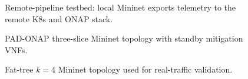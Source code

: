 
\begin{figure}[H]
\centering
\resizebox{\textwidth}{!}{}
\caption{Remote-pipeline testbed: local Mininet exports telemetry to the remote K8s and ONAP stack.}
\label{fig:testbed-remote-pipeline}
\end{figure}

\begin{figure}[H]
\centering
\resizebox{0.98\textwidth}{!}{}
\caption{PAD-ONAP three-slice Mininet topology with standby mitigation VNFs.}
\label{fig:testbed-3slice-topology}
\end{figure}

\begin{figure}[H]
\centering
\resizebox{\textwidth}{!}{}
\caption{Fat-tree $k=4$ Mininet topology used for real-traffic validation.}
\label{fig:testbed-fat-tree-k4}
\end{figure}
